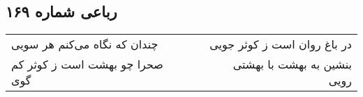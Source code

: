 \begin{center}
\section*{رباعی شماره ۱۶۹}
\label{sec:sh169}
\begin{longtable}{l p{0.5cm} r}
چندان که نگاه می‌کنم هر سویی
&&
در باغ روان است ز کوثر جویی
\\
صحرا چو بهشت است ز کوثر کم گوی
&&
بنشین به بهشت با بهشتی رویی
\\
\end{longtable}
\end{center}
